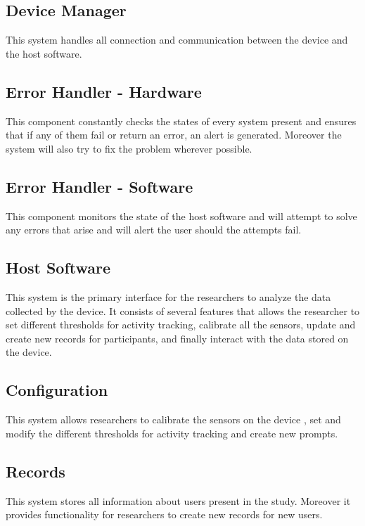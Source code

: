\documentclass{article}
\begin{document}
\subsection{\label{DevMan_sec}Device Manager}
This system handles all connection and communication between the device and the host software.

\subsection{\label{ErrHand_sec}Error Handler - Hardware}
This component constantly checks the states of every system present and ensures that if any of them fail or return an error, an alert is generated. Moreover the system will also try to fix the problem 					wherever possible.

\subsection{Error Handler - Software}
This component monitors the state of the host software and will attempt to solve any errors that arise and will alert the user should the attempts fail.

\subsection{\label{HostSfwr_sec}Host Software}
This system is the primary interface for the researchers to analyze the data collected by the device. It consists of several features that allows the researcher to set different
thresholds for activity tracking, calibrate all the sensors, update and create new records for participants, and finally interact with the data stored on the device.

\subsection{\label{Configuration_sec}Configuration}
This system allows researchers to calibrate the sensors on the device , set and modify the different thresholds for activity tracking and create new prompts.

\subsection{\label{Records_sec}Records}
This system stores all information about users present in the study. Moreover it provides functionality for researchers to create new records for new users.
\end{document}
